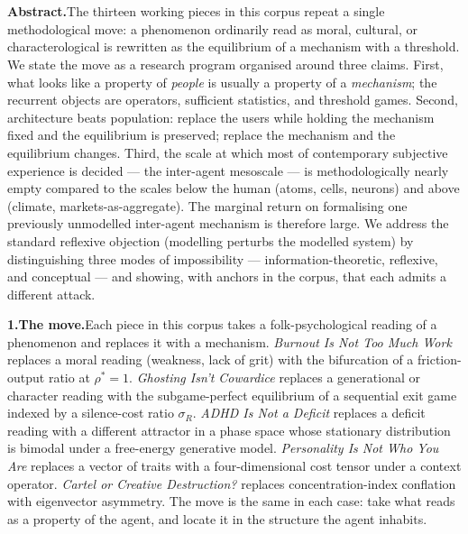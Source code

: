 \documentclass[11pt]{article}
\begin{document}
\\[0.15em]
\\[0.4em]
\vspace{0.6cm}

\noindent\textbf{Abstract.}\quad The thirteen working pieces in this corpus
repeat a single methodological move: a phenomenon ordinarily read as moral,
cultural, or characterological is rewritten as the equilibrium of a mechanism
with a threshold. We state the move as a research program organised around
three claims. First, what looks like a property of \textit{people} is usually
a property of a \textit{mechanism}; the recurrent objects are operators,
sufficient statistics, and threshold games. Second, architecture beats
population: replace the users while holding the mechanism fixed and the
equilibrium is preserved; replace the mechanism and the equilibrium changes.
Third, the scale at which most of contemporary subjective experience is
decided --- the inter-agent mesoscale --- is methodologically nearly empty
compared to the scales below the human (atoms, cells, neurons) and above
(climate, markets-as-aggregate). The marginal return on formalising one
previously unmodelled inter-agent mechanism is therefore large. We address
the standard reflexive objection (modelling perturbs the modelled system) by
distinguishing three modes of impossibility --- information-theoretic,
reflexive, and conceptual --- and showing, with anchors in the corpus, that
each admits a different attack.

\bigskip\noindent\textbf{1.\quad The move.}\quad Each piece in this corpus
takes a folk-psychological reading of a phenomenon and replaces it with a
mechanism. \textit{Burnout Is Not Too Much Work} replaces a moral reading
(weakness, lack of grit) with the bifurcation of a friction-output ratio at
$\rho^* = 1$. \textit{Ghosting Isn't Cowardice} replaces a generational or
character reading with the subgame-perfect equilibrium of a sequential exit
game indexed by a silence-cost ratio $\sigma_R$. \textit{ADHD Is Not a
Deficit} replaces a deficit reading with a different attractor in a phase
space whose stationary distribution is bimodal under a free-energy
generative model. \textit{Personality Is Not Who You Are} replaces a vector
of traits with a four-dimensional cost tensor under a context operator.
\textit{Cartel or Creative Destruction?} replaces concentration-index
conflation with eigenvector asymmetry. The move is the same in each case:
take what reads as a property of the agent, and locate it in the structure
the agent inhabits.
\end{document}
